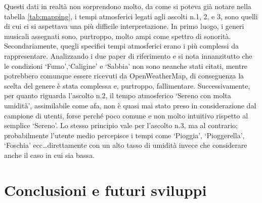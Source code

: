 \documentclass[12pt,a4paper]{report}
\begin{document}
Questi dati in realtà non sorprendono molto, da come si poteva già notare nella tabella \ref{tab:mapping}, i tempi atmosferici legati agli ascolti n.1, 2, e 3, sono quelli di cui ci si aspettava una più difficile interpretazione. In primo luogo, i generi musicali assegnati sono, purtroppo, molto ampi come spettro di sonorità. Secondariamente, quegli specifici tempi atmosferici erano i più complessi da rappresentare. Analizzando i due paper di riferimento \cite{karmaker2015automated} e \cite{predictingmoodonmusicgenre} si nota innanzitutto che le condizioni `Fumo',`Caligine' e `Sabbia' non sono neanche stati citati, mentre potrebbero comunque essere ricevuti da OpenWeatherMap, di conseguenza la scelta del genere è stata complessa e, purtroppo, fallimentare. Successivamente, per quanto riguarda l'ascolto n.2, il tempo atmosferico `Sereno con molta umidità', assimilabile come afa, non è quasi mai stato preso in considerazione dal campione di utenti, forse perché poco comune e non molto intuitivo rispetto al semplice `Sereno'. Lo stesso principio vale per l'ascolto n.3, ma al contrario; probabilmente l'utente medio percepisce i tempi come `Pioggia', `Pioggerella', `Foschia' ecc\dots direttamente con un alto tasso di umidità invece che considerare anche il caso in cui sia bassa.




\chapter{Conclusioni e futuri sviluppi}\label{sec:conclusions}
\end{document}
